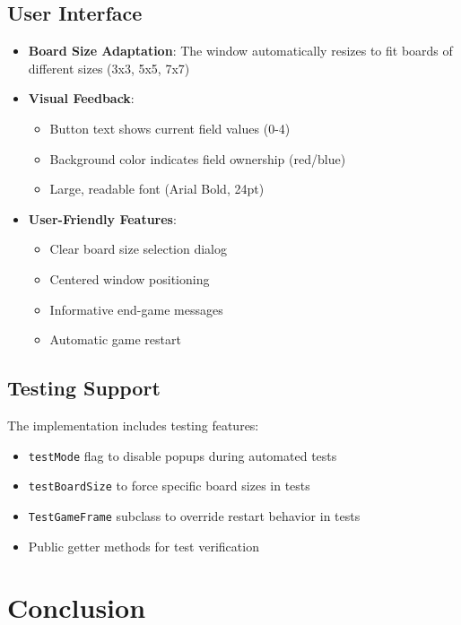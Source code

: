 \documentclass[12pt,a4paper]{article}
\begin{document}
\subsection{User Interface}

\begin{itemize}
    \item \textbf{Board Size Adaptation}: The window automatically resizes to fit boards of different sizes (3x3, 5x5, 7x7)
    \item \textbf{Visual Feedback}: 
    \begin{itemize}
        \item Button text shows current field values (0-4)
        \item Background color indicates field ownership (red/blue)
        \item Large, readable font (Arial Bold, 24pt)
    \end{itemize}
    \item \textbf{User-Friendly Features}:
    \begin{itemize}
        \item Clear board size selection dialog
        \item Centered window positioning
        \item Informative end-game messages
        \item Automatic game restart
    \end{itemize}
\end{itemize}

\subsection{Testing Support}

The implementation includes testing features:
\begin{itemize}
    \item \texttt{testMode} flag to disable popups during automated tests
    \item \texttt{testBoardSize} to force specific board sizes in tests
    \item \texttt{TestGameFrame} subclass to override restart behavior in tests
    \item Public getter methods for test verification
\end{itemize}

\section{Conclusion}
\end{document}
